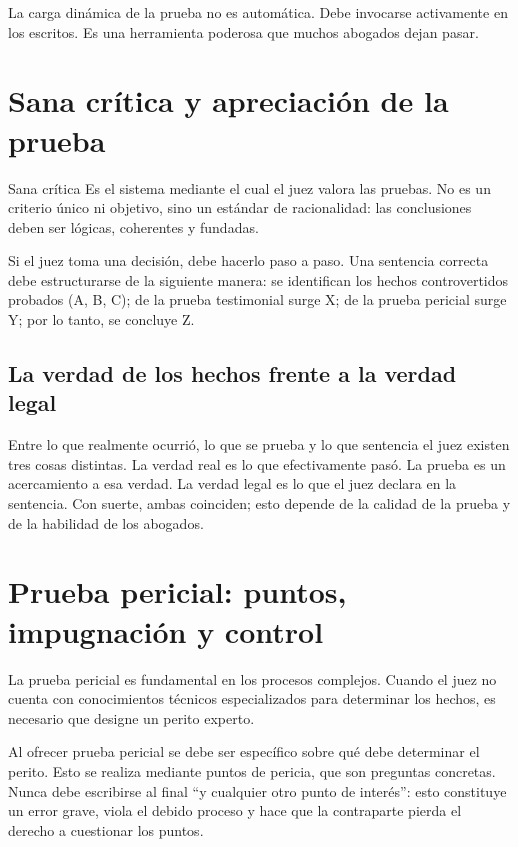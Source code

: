 \documentclass[12pt,oneside]{book}
\begin{document}
\begin{important}
La carga dinámica de la prueba no es automática. Debe invocarse activamente en los escritos. Es una herramienta poderosa que muchos abogados dejan pasar.
\end{important}

\section{Sana crítica y apreciación de la prueba}

\begin{definition}{Sana crítica}
Es el sistema mediante el cual el juez valora las pruebas. No es un criterio único ni objetivo, sino un estándar de racionalidad: las conclusiones deben ser lógicas, coherentes y fundadas.
\end{definition}

Si el juez toma una decisión, debe hacerlo paso a paso. Una sentencia correcta debe estructurarse de la siguiente manera: se identifican los hechos controvertidos probados (A, B, C); de la prueba testimonial surge X; de la prueba pericial surge Y; por lo tanto, se concluye Z.

\subsection{La verdad de los hechos frente a la verdad legal}

Entre lo que realmente ocurrió, lo que se prueba y lo que sentencia el juez existen tres cosas distintas. La verdad real es lo que efectivamente pasó. La prueba es un acercamiento a esa verdad. La verdad legal es lo que el juez declara en la sentencia. Con suerte, ambas coinciden; esto depende de la calidad de la prueba y de la habilidad de los abogados.

\section{Prueba pericial: puntos, impugnación y control}

La prueba pericial es fundamental en los procesos complejos. Cuando el juez no cuenta con conocimientos técnicos especializados para determinar los hechos, es necesario que designe un perito experto.

\begin{important}
Al ofrecer prueba pericial se debe ser específico sobre qué debe determinar el perito. Esto se realiza mediante puntos de pericia, que son preguntas concretas. Nunca debe escribirse al final ``y cualquier otro punto de interés'': esto constituye un error grave, viola el debido proceso y hace que la contraparte pierda el derecho a cuestionar los puntos.
\end{important}
\end{document}
